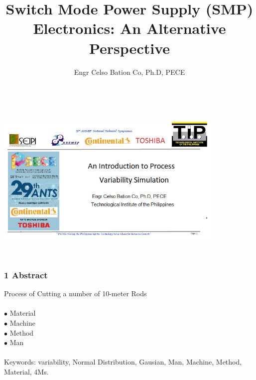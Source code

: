 \documentclass[11pt]{beamer}
\begin{document}
\begin{center}
\includegraphics[width=11cm,height=8cm,clip]{TitlePageMCS2019.png}
\end{center}
\author{Engr Celso Bation Co, Ph.D, PECE}
\title{Switch Mode Power Supply (SMP) Electronics: An Alternative Perspective}
\subtitle{}
\date{}
\subject{}

\begin{frame}
\frametitle{1 Abstract}
\noindent Process of Cutting a number of 10-meter Rods  \\  \ \\     $\bullet$ Material \\     $\bullet$ Machine \\     $\bullet$ Method \\     $\bullet$ Man 
\noindent \\ \ \\Keywords: variability, Normal Distribution, Gausian, Man, Machine, Method, Material,     4Ms.

\end{frame}
\end{document}
